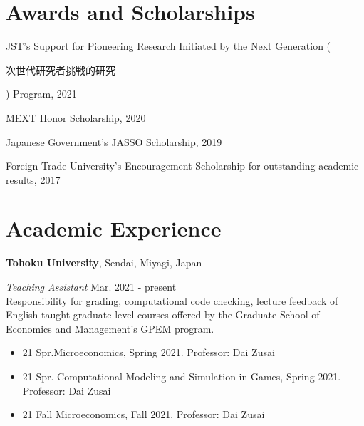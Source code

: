 \documentclass[a4paper,20pt]{article}
\newcommand\textjp[1]{%
	\begin{CJK}{UTF8}{min}#1\end{CJK}}
\begin{document}
	\vspace{4pt}
	\section{Awards and Scholarships}
	\begin{description}
		\item JST's Support for Pioneering Research Initiated by the Next Generation (\textjp{次世代研究者挑戦的研究}) Program, 2021
		\vspace*{-7pt}
		\item MEXT Honor Scholarship, 2020
		\vspace*{-7pt}
		\item Japanese Government's JASSO Scholarship, 2019
		\vspace*{-7pt}
		\item Foreign Trade University's Encouragement Scholarship for outstanding academic results, 2017
	\end{description}
	
	\vspace{4pt}
	
	\vspace{-5pt}
	\section{Academic Experience}
	
	\textbf{Tohoku University}, Sendai, Miyagi, Japan
	
	\hspace{4mm} \textit{Teaching Assistant} \hfill {Mar. 2021 - present}\\
	\hspace{4mm} Responsibility for grading, computational code checking, lecture feedback of English-taught graduate level courses offered by the Graduate School of Economics and Management's GPEM program. 
	\vspace{-7pt}
	\hspace{6mm} \begin{itemize}
		\item 21 Spr.Microeconomics, Spring 2021. Professor: Dai Zusai
		\vspace{-7pt}
		\item 21 Spr. Computational Modeling and Simulation in Games, Spring 2021. Professor: Dai Zusai
		\vspace{-7pt}
		\item 21 Fall Microeconomics, Fall 2021. Professor: Dai Zusai
	\end{itemize}
	
\end{document}
